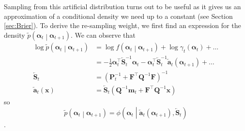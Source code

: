 \documentclass[notitlepage]{article}
\renewcommand{\vec}[1]{\bm{#1}}
\newcommand{\vecLarrow}[1]{\overleftarrow{\vec{#1}}}
\newcommand{\mat}[1]{\mathbf{#1}}
\newcommand{\matLarrow}[1]{\overleftarrow{\mat{#1}}}
\newcommand{\Lparen}[1]{\left( #1\right)}
\newcommand{\Cond}[2]{ #1 \middle\vert  #2}
\newcommand{\optor}[2]{#1\Lparen{#2}}
\newcommand{\optorC}[3]{\optor{#1}{\Cond{#2}{#3}}}
\newcommand{\pdenstC}[2]{\optorC{\widetilde p}{#1}{#2}}
\newcommand{\normaldC}[3]{\optorC{\phi}{#1}{#2,#3}}
\begin{document}
Sampling from this artificial distribution turns out to be useful as it gives us an approximation of a
conditional density we need up to a constant (see Section \ref{sec:Brier}).
To derive the re-sampling weight, we first find an expression for the density $\pdenstC{\vec{\alpha}_t}{\vec{\alpha}_{t + 1}}$. 
We can observe that %
%
\begin{align*}
\log\pdenstC{\vec{\alpha}_t}{\vec{\alpha}_{t + 1}} &=  
	\log \optorC{f}{\vec\alpha_t}{\vec\alpha_{t + 1}}
	+ \log \gamma_t(\vec\alpha_t) + \dots \\
	&= -\frac 12\vec\alpha_t^\top\matLarrow{S}_t^{-1}
	\vec\alpha_t - \vec\alpha_t^\top\matLarrow{S}_t^{-1}
	\vecLarrow{a}_t(\vec\alpha_{t+1})
	+ \dots \\
\matLarrow{S}_t  &= \Lparen{\mat P^{-1}_t + \mat F^\top\mat Q^{-1}\mat F}^{-1} \\
\vecLarrow{a}_t(\vec x) &= 
	\matLarrow{S}_t\Lparen{\mat Q^{-1}\vec m_t + \mat F^\top \mat Q^{-1}\vec x}
\end{align*}
%
so %
%
\begin{equation}\label{eqn:bwTransProp}
\pdenstC{\vec{\alpha}_t}{\vec{\alpha}_{t + 1}} = %
\normaldC{\vec\alpha_t}{\vecLarrow{a}_t(\vec{\alpha}_{t + 1})}%
{\matLarrow{S}_t}
\end{equation}. 
\end{document}
